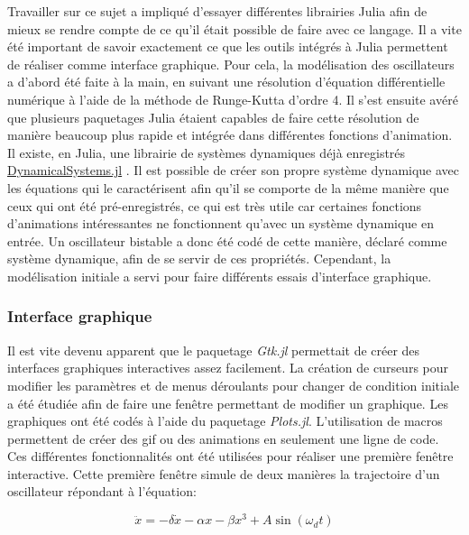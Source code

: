 \documentclass[a4paper, french, 12pt, titlepage]{article}
\begin{document}
Travailler sur ce sujet a impliqué d'essayer différentes librairies Julia afin de mieux se rendre compte de ce qu'il était possible de faire avec ce langage.
Il a vite été important de savoir exactement ce que les outils intégrés à Julia permettent de réaliser comme interface graphique.
Pour cela, la modélisation des oscillateurs a d'abord été faite \og à la main\fg, en suivant une résolution d'équation différentielle numérique à l'aide de la méthode de Runge-Kutta d'ordre 4.
Il s'est ensuite avéré que plusieurs paquetages Julia étaient capables de faire cette résolution de manière beaucoup plus rapide et intégrée dans différentes fonctions d'animation.
Il existe, en Julia, une librairie de systèmes dynamiques déjà enregistrés \href{https://juliadynamics.github.io/DynamicalSystems.jl/latest/}{DynamicalSystems.jl} \cite{Datseris2018}.
Il est possible de créer son propre système dynamique avec les équations qui le caractérisent afin qu'il se comporte de la même manière que ceux qui ont été pré-enregistrés, ce qui est très utile car certaines fonctions d'animations intéressantes ne fonctionnent qu'avec un système dynamique en entrée.
Un oscillateur bistable a donc été codé de cette manière, déclaré comme système dynamique, afin de se servir de ces propriétés.
Cependant, la modélisation initiale a servi pour faire différents essais d'interface graphique.


\subsubsection{Interface graphique}

Il est vite devenu apparent que le paquetage \emph{Gtk.jl} permettait de créer des interfaces graphiques interactives assez facilement.
La création de curseurs pour modifier les paramètres et de menus déroulants pour changer de condition initiale a été étudiée afin de faire une fenêtre permettant de modifier un graphique.
Les graphiques ont été codés à l'aide du paquetage \emph{Plots.jl}.
L'utilisation de macros permettent de créer des gif ou des animations en seulement une ligne de code.
Ces différentes fonctionnalités ont été utilisées pour réaliser une première fenêtre interactive.
Cette première fenêtre simule  de deux manières la trajectoire d'un oscillateur répondant à l'équation:

\begin{equation}
  \ddot x = - \delta  \dot x - \alpha  x - \beta  x^3 + A \sin(\omega_d t)
\end{equation}
\end{document}
